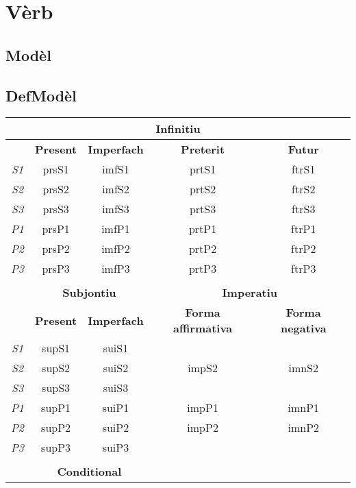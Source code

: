 \documentclass[10pt,a4paper,final]{article}
\author{Òsca-Font dubèrta}
\begin{document}
\section*{Vèrb}
\subsection*{Modèl}
\subsection*{DefModèl}

\begin{tabular}{|c|c|c|c|c|}
\hline 
\multicolumn{5}{|c|}{\textbf{Infinitiu}} \\ 
\hline 
 & \textbf{Present} & \textbf{Imperfach} & \textbf{Preterit} & \textbf{Futur} \\ 
\hline 
\textit{S1} & prsS1 & imfS1 & prtS1 & ftrS1 \\ 
\hline 
\textit{S2} & prsS2 & imfS2 & prtS2 & ftrS2 \\ 
\hline 
\textit{S3} & prsS3 & imfS3 & prtS3 & ftrS3 \\ 
\hline 
\textit{P1} & prsP1 & imfP1 & prtP1 & ftrP1 \\ 
\hline 
\textit{P2} & prsP2 & imfP2 & prtP2 & ftrP2 \\ 
\hline 
\textit{P3} & prsP3 & imfP3 & prtP3 & ftrP3 \\ 
\hline 
\multicolumn{5}{|c|}{} \\ 
\hline 
 & \multicolumn{2}{c|}{\textbf{Subjontiu}}  & \multicolumn{2}{c|}{\textbf{Imperatiu}} \\ 
\hline 
 & \textbf{Present} & \textbf{Imperfach} & \textbf{Forma affirmativa} & \textbf{Forma negativa} \\ 
\hline 
\textit{S1} & supS1 & suiS1 & \multicolumn{2}{c|}{} \\ 
\hline 
\textit{S2} & supS2 & suiS2 & impS2 & imnS2 \\ 
\hline 
\textit{S3} & supS3 & suiS3 & \multicolumn{2}{c|}{} \\ 
\hline 
\textit{P1} & supP1 & suiP1 & impP1 & imnP1 \\ 
\hline 
\textit{P2} & supP2 & suiP2 & impP2 & imnP2 \\ 
\hline 
\textit{P3} & supP3 & suiP3 & \multicolumn{2}{c|}{} \\ 
\hline 
\multicolumn{5}{|c|}{} \\ 
\hline 
 & \multicolumn{2}{c|}{\textbf{Conditional}} & \multicolumn{2}{c|}{} \\ 

\end{tabular}
\end{document}
